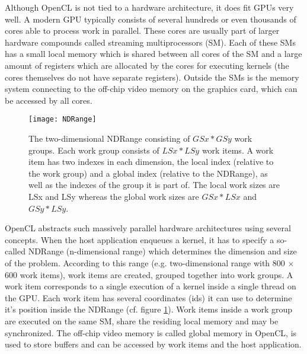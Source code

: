 Although OpenCL is not tied to a hardware architecture, it does fit GPUs very well. A modern GPU typically consists of several hundreds or even thousands of cores able to process work in parallel. These cores are usually part of larger hardware compounds called streaming multiprocessors (SM). Each of these SMs has a small local memory which is shared between all cores of the SM and a large amount of registers which are allocated by the cores for executing kernels (the cores themselves do not have separate registers). Outside the SMs is the memory system connecting to the off-chip video memory on the graphics card, which can be accessed by all cores. 

\begin{figure} 
\centering
\texttt{[image: NDRange]}
\caption{The two-dimensional NDRange consisting of $GSx * GSy$ work groups. Each work group consists of $LSx * LSy$ work items. A work item has two indexes in each dimension, the local index (relative to the work group) and a global index (relative to the NDRange), as well as the indexes of the group it is part of. The local work sizes are LSx and LSy whereas the global work sizes are $GSx * LSx$ and $GSy * LSy$.}
\label{fig:NDRange}
\end{figure}

OpenCL abstracts such massively parallel hardware architectures using several concepts. When the host application enqueues a kernel, it has to specify a so-called NDRange (n-dimensional range) which determines the dimension and size of the problem. According to this range (e.g. two-dimensional range with 800 $\times$ 600 work items), work items are created, grouped together into work groups. A work item corresponds to a single execution of a kernel inside a single thread on the GPU. Each work item has several coordinates (ids) it can use to determine it's position inside the NDRange (cf. figure \ref{fig:NDRange}). Work items inside a work group are executed on the same SM, share the residing local memory and may be synchronized. The off-chip video memory is called global memory in OpenCL, is used to store buffers and can be accessed by work items and the host application.
